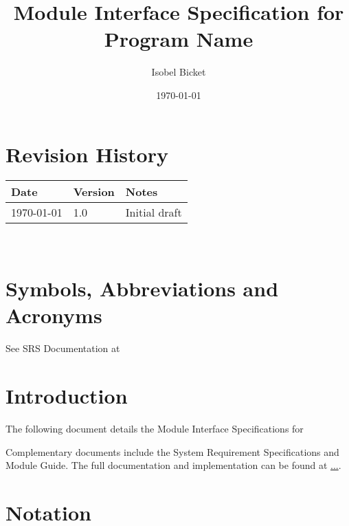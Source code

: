 \documentclass[12pt, titlepage]{article}
\newcommand{\progname}{Program Name}
\begin{document}
\title{Module Interface Specification for \progname{}}

\author{Isobel Bicket}

\date{\today}

\maketitle


\section{Revision History}

\begin{tabularx}{\textwidth}{p{3cm}p{2cm}X}
\toprule {\bf Date} & {\bf Version} & {\bf Notes}\\
\midrule
	\today & 1.0 & Initial draft\\
\bottomrule
\end{tabularx}

~\newpage

\section{Symbols, Abbreviations and Acronyms}

See SRS Documentation at 


\newpage

\tableofcontents

\newpage


\section{Introduction}

The following document details the Module Interface Specifications for

Complementary documents include the System Requirement Specifications
and Module Guide.  The full documentation and implementation can be
found at \url{...}.  

\section{Notation}
\end{document}
